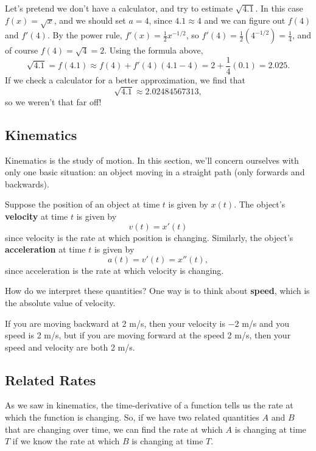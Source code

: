 \begin{exampleblock}
Let's pretend we don't have a calculator, and try to estimate $\sqrt{4.1}$. In this case $f(x)=\sqrt{x}$, and we should set $a=4$, since $4.1\approx 4$ and we can figure out $f(4)$ and $f'(4)$. By the power rule, $f'(x)=\frac{1}{2}x^{-1/2}$, so $f'(4)=\frac12(4^{-1/2})=\frac14$, and of course $f(4)=\sqrt{4}=2$. Using the formula above,
$$\sqrt{4.1}=f(4.1)\approx f(4)+f'(4)(4.1-4)=2+\frac14(0.1)=2.025.$$
If we check a calculator for a better approximation, we find that
$$\sqrt{4.1}\approx 2.02484567313,$$
so we weren't that far off!
\end{exampleblock}

\subsection{Kinematics}

Kinematics is the study of motion. In this section, we'll concern ourselves with only one basic situation: an object moving in a straight path (only forwards and backwards).

Suppose the position of an object at time $t$ is given by $x(t)$. The object's \textbf{velocity} at time $t$ is given by $$v(t)=x'(t)$$ since velocity is the rate at which position is changing. Similarly, the object's \textbf{acceleration} at time $t$ is given by $$a(t)=v'(t)=x''(t),$$ since acceleration is the rate at which velocity is changing.

How do we interpret these quantities? One way is to think about \textbf{speed}, which is the absolute value of velocity.
\begin{exampleblock}
If you are moving backward at 2 m/s, then your velocity is $-$2 m/s and you speed is 2 m/s, but if you are moving forward at the speed 2 m/s, then your speed and velocity are both 2 m/s.
\end{exampleblock}




\subsection{Related Rates}

As we saw in kinematics, the time-derivative of a function tells us the rate at which the function is changing. So, if we have two related quantities $A$ and $B$ that are changing over time, we can find the rate at which $A$ is changing at time $T$ if we know the rate at which $B$ is changing at time $T$.

